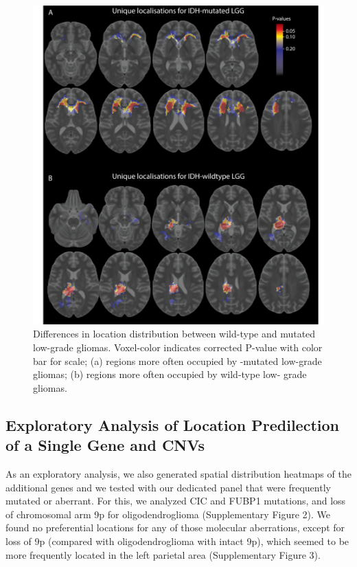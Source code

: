 \begin{figure}
\centering
\includegraphics[width=\textwidth]{Figures/Figure_2.png}
\caption{Differences in location distribution between  wild-type and mutated low-grade gliomas. Voxel-color indicates corrected P-value with
color bar for scale; (a) regions more often occupied by -mutated low-grade gliomas; (b) regions more often occupied by  wild-type low-
grade gliomas.}
\label{fig:LGG_location_P_values}
\end{figure}

\subsection{Exploratory Analysis of Location Predilection of a Single Gene and CNVs}

As an exploratory analysis, we also generated spatial distribution heatmaps of the additional genes and  we tested with our dedicated  panel that were frequently mutated or aberrant.
For this, we analyzed CIC and FUBP1 mutations, and loss of chromosomal arm 9p for oligodendroglioma (Supplementary Figure 2).
We found no preferential locations for any of those molecular aberrations, except for loss of 9p (compared with oligodendroglioma with intact 9p), which seemed to be more frequently located in the left parietal area (Supplementary Figure 3).

